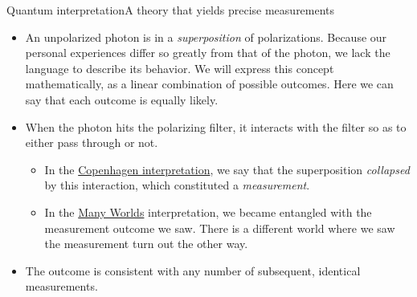 \begin{frame}{Quantum interpretation}{A theory that yields precise measurements}
\begin{itemize}
    \item An unpolarized photon is in a \emph{superposition} of polarizations.  Because our personal experiences differ so greatly from that of the photon, we lack the language to describe its behavior.  We will express this concept mathematically, as a linear combination of possible outcomes.  Here we can say that each outcome is equally likely.
    \item When the photon hits the polarizing filter, it interacts with the filter so as to either pass through or not.
    \begin{itemize}
        \item In the \href{https://en.wikipedia.org/wiki/Copenhagen_interpretation}{Copenhagen interpretation}, we say that the superposition \emph{collapsed} by this interaction, which constituted a \emph{measurement}.
        \item In the \href{https://en.wikipedia.org/wiki/Many-worlds_interpretation}{Many Worlds} interpretation, we became entangled with the measurement outcome we saw.  There is a different world where we saw the measurement turn out the other way.
    \end{itemize}
    \item The outcome is consistent with any number of subsequent, identical measurements.
    
\end{itemize}
\end{frame}

